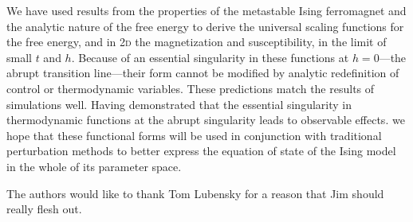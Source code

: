 \documentclass[aps,prl,reprint]{revtex4-1}
\begin{document}
We have used results from the properties of the metastable Ising ferromagnet
and the analytic nature of the free energy to derive the universal scaling
functions for the free energy, and in \textsc{2d} the magnetization and
susceptibility, in the limit of small $t$ and $h$. Because of an essential
singularity in these functions at $h=0$---the abrupt transition line---their
form cannot be modified by analytic redefinition of control or thermodynamic
variables. These predictions match the results of simulations well. Having
demonstrated that the essential singularity in thermodynamic functions at the
abrupt singularity leads to observable effects. we hope that these functional
forms will be used in conjunction with traditional perturbation methods to
better express the equation of state of the Ising model in the whole of its
parameter space.

\begin{acknowledgments}
  The authors would like to thank Tom Lubensky for a reason that Jim should
  really flesh out.
\end{acknowledgments}


\end{document}
